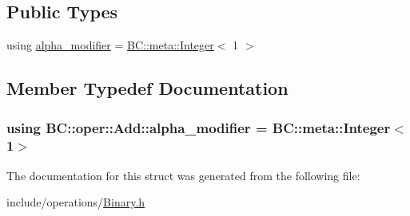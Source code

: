\subsection*{Public Types}
\begin{DoxyCompactItemize}
\item 
using \hyperlink{structBC_1_1oper_1_1Add_af0fca0b03bb8472331f3cc86918c6b2e}{alpha\+\_\+modifier} = \hyperlink{structBC_1_1meta_1_1Integer}{B\+C\+::meta\+::\+Integer}$<$ 1 $>$
\end{DoxyCompactItemize}


\subsection{Member Typedef Documentation}
\subsubsection[{\texorpdfstring{alpha\+\_\+modifier}{alpha_modifier}}]{\setlength{\rightskip}{0pt plus 5cm}using {\bf B\+C\+::oper\+::\+Add\+::alpha\+\_\+modifier} =  {\bf B\+C\+::meta\+::\+Integer}$<$1$>$}\hypertarget{structBC_1_1oper_1_1Add_af0fca0b03bb8472331f3cc86918c6b2e}{}\label{structBC_1_1oper_1_1Add_af0fca0b03bb8472331f3cc86918c6b2e}


The documentation for this struct was generated from the following file\+:\begin{DoxyCompactItemize}
\item 
include/operations/\hyperlink{Binary_8h}{Binary.\+h}\end{DoxyCompactItemize}
